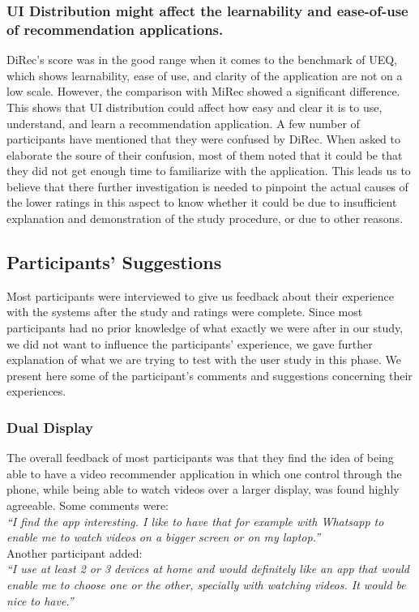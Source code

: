 \subsubsection{UI Distribution might affect the learnability and ease-of-use of recommendation applications.}
DiRec's score was in the good range when it comes to the benchmark of UEQ, which
shows learnability, ease of use, and clarity of the application are not on a low
scale. However, the comparison with MiRec showed a significant difference. This
shows that UI distribution could affect how easy and clear it is to use,
understand, and learn a recommendation application. A few number of participants
have mentioned that they were confused by DiRec. When asked to elaborate the
soure of their confusion, most of them noted that it could be that they did not
get enough time to familiarize with the application. This leads us to believe
that there further investigation is needed to pinpoint the actual causes of the
lower ratings in this aspect to know whether it could be due to insufficient
explanation and demonstration of the study procedure, or due to other reasons.
\subsection{Participants' Suggestions}
Most participants were interviewed to give us feedback about their experience
with the systems after the study and ratings were complete. Since most
participants had no prior knowledge of what exactly we were after in our study,
we did not want to influence the participants' experience, we gave further
explanation of what we are trying to test with the user study in this phase. We
present here some of the participant's comments and suggestions concerning their
experiences.
\subsubsection{Dual Display}
The overall feedback of most participants was that they find the idea of being
able to have a video recommender application in which one control through the
phone, while being able to watch videos over a larger display, was found highly
agreeable. Some comments were:\\
\textit{``I find the app interesting. I like to have that for example with Whatsapp
to enable me to watch videos on a bigger screen or on my laptop.''}\\
Another participant added:\\
\textit{``I use at least 2 or 3 devices at home and would definitely like an app
that would enable me to choose one or the other, specially with watching videos. It
would be nice to have.''}  
